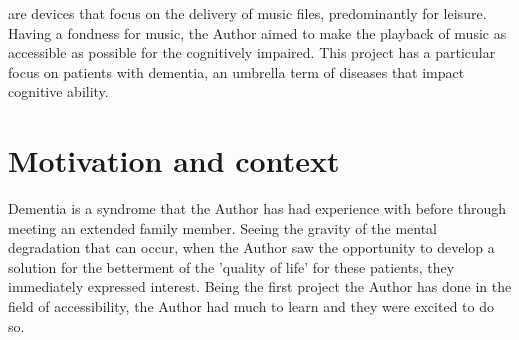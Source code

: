 %

 are devices that focus on the delivery of music files, predominantly for leisure. Having a fondness for music, the Author aimed to make the playback of music as accessible as possible for the cognitively impaired. This project has a particular focus on patients with dementia, an umbrella term of diseases that impact cognitive ability.

\section{Motivation and context}\label{sec:motivation}
Dementia is a syndrome that the Author has had experience with before through meeting an extended family member. Seeing the gravity of the mental degradation that can occur, when the Author saw the opportunity to develop a solution for the betterment of the 'quality of life' for these patients, they immediately expressed interest. Being the first project the Author has done in the field of accessibility, the Author had much to learn and they were excited to do so.

